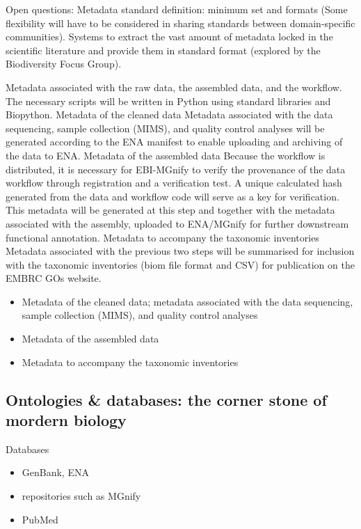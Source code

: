       Open questions: 
      Metadata standard definition: minimum set and formats (Some flexibility will have to be considered in sharing standards between domain-specific communities).
      Systems to extract the vast amount of metadata locked in the scientific literature and provide them in standard format (explored by the Biodiversity Focus Group).


      Metadata associated with the raw data, the assembled data, and the workflow. The necessary scripts will be written in Python using standard libraries and Biopython. 
      Metadata of the cleaned data
      Metadata associated with the data sequencing, sample collection (MIMS), and quality control analyses will be generated according to the ENA manifest to enable uploading and archiving of the data to ENA.
      Metadata of the assembled data
      Because the workflow is distributed, it is necessary for EBI-MGnify to verify the provenance of the data workflow through registration and a verification test. A unique calculated hash generated from the data and workflow code will serve as a key for verification. This metadata will be generated at this step and together with the metadata associated with the assembly, uploaded to ENA/MGnify for further downstream functional annotation.
      Metadata to accompany the taxonomic inventories
      Metadata associated with the previous two steps will be summarised for inclusion with the taxonomic inventories (biom file format and CSV) for publication on the EMBRC GOs website.


      \begin{itemize}
         \item Metadata of the cleaned data; metadata associated with the data sequencing, sample collection (MIMS), and quality control analyses
         \item Metadata of the assembled data
         \item Metadata to accompany the taxonomic inventories

      \end{itemize}  




   \subsection*{Ontologies \& databases: the corner stone of mordern biology}


      Databases

      \begin{itemize}
         \item GenBank, ENA
         \item repositories such as MGnify 
         \item PubMed
      \end{itemize}


